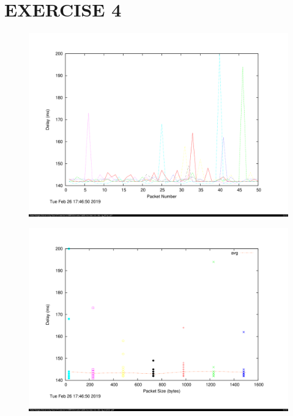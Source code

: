 \documentclass[a4paper,11pt]{article}
\begin{document}
\section{EXERCISE 4}
		\begin{figure}[!htb]
		    \centering
			\begin{minipage}{\textwidth}
		        \centering
		        \includegraphics[width=\linewidth, height=0.4\textheight]{nusdelay.png}
		    \end{minipage}%
		\end{figure}

		\begin{figure}[!htb]
			\centering
			\begin{minipage}{\textwidth}
		        \centering
		        \includegraphics[width=\linewidth, height=0.4\textheight]{nusscatter.png}
		    \end{minipage}
		\end{figure}
\end{document}
